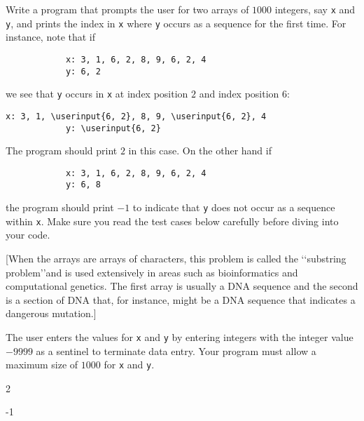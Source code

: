 Write a program that prompts the user for two arrays of $1000$ integers, say
\verb!x! and \verb!y!, and prints the index in \verb!x! where \verb!y! occurs
as a sequence for the first time. For instance, note that if

\begin{Verbatim}
            x: 3, 1, 6, 2, 8, 9, 6, 2, 4
            y: 6, 2
\end{Verbatim}

we see that \verb!y! occurs in \verb!x! at index position $2$ and index
position $6$:

\begin{Verbatim}[commandchars=\\\{\}]
            x: 3, 1, \userinput{6, 2}, 8, 9, \userinput{6, 2}, 4
            y: \userinput{6, 2}
\end{Verbatim}

The program should print $2$ in this case. On the other hand if

\begin{Verbatim}
            x: 3, 1, 6, 2, 8, 9, 6, 2, 4
            y: 6, 8
\end{Verbatim}

the program should print $-1$ to indicate that \verb!y! does not occur as a
sequence within \verb!x!. Make sure you read the test cases below carefully
before diving into your code.

[When the arrays are arrays of characters, this problem is called the
\lq\lq substring problem\rq\rq and is used extensively in areas such as
bioinformatics and computational genetics. The first array is usually a DNA
sequence and the second is a section of DNA that, for instance, might be a DNA
sequence that indicates a dangerous mutation.]

The user enters the values for \verb!x! and \verb!y! by entering integers with
the integer value $-9999$ as a sentinel to terminate data entry. Your program
must allow a maximum size of $1000$ for \verb!x! and \verb!y!.


\resett
\nextt
\begin{console}[frame=single, commandchars=\\\{\}]
2
\end{console}

\nextt
\begin{console}[frame=single, commandchars=\\\{\}]
-1
\end{console}

